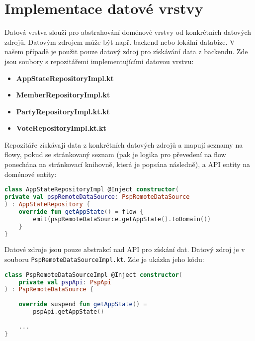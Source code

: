 \section {Implementace datové vrstvy}
Datová vrstva slouží pro abstrahování doménové vrstvy od konkrétních datových zdrojů. Datovým zdrojem může být např. backend nebo lokální databíze. V našem případě je použit pouze datový zdroj pro získávání data z backendu. Zde jsou soubory s repozitářemi implementujícími datovou vrstvu:

\begin{itemize}
	\item \textbf{AppStateRepositoryImpl.kt}
	\item \textbf{MemberRepositoryImpl.kt}
	\item \textbf{PartyRepositoryImpl.kt.kt}
	\item \textbf{VoteRepositoryImpl.kt.kt}
\end{itemize}

\noindent Repozitáře získávají data z konkrétních datových zdrojů a mapují seznamy na flowy, pokud se stránkovaný seznam (pak je logika pro převedení na flow ponechána na stránkovací \linebreak knihovně, která je popsána následně), a API entity na doménové entity:

\begin{lstlisting}[caption={Ukázka datové vrstvy pro data o stavu aplikace}, label={lst:use-case-repository}, tabsize=2, language=Kotlin]
class AppStateRepositoryImpl @Inject constructor(
private val pspRemoteDataSource: PspRemoteDataSource
) : AppStateRepository {
	override fun getAppState() = flow { 			
		emit(pspRemoteDataSource.getAppState().toDomain()) 
	}
}
\end{lstlisting}

\noindent Datové zdroje jsou pouze abstrakcí nad API pro získání dat. Datový zdroj je v souboru \linebreak \lstinline|PspRemoteDataSourceImpl.kt|. Zde je ukázka jeho kódu:

\newpage

\begin{lstlisting}[caption={Ukázka datového zdroje}, label={lst:data-source}, tabsize=2, language=Kotlin]
class PspRemoteDataSourceImpl @Inject constructor(
	private val pspApi: PspApi
) : PspRemoteDataSource {
	
	override suspend fun getAppState() = 
		pspApi.getAppState()
		
	...
}
\end{lstlisting}

